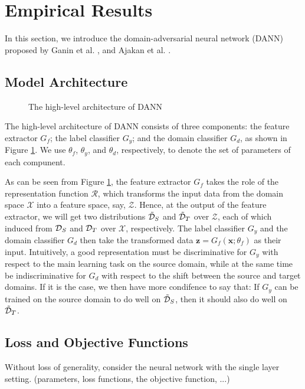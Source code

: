 \section{Empirical Results}\label{sect:dann}
In this section, we introduce the domain-adversarial neural network (DANN) proposed by Ganin et al. \cite{Ganin2016}, \cite{Ganin2015} and Ajakan et al. \cite{Ajakan2014}.

\subsection{Model Architecture}\label{sub:model_arch}
\begin{figure}
  \centering
  
  \caption{The high-level architecture of DANN}
  \label{fig:dann_arch}
\end{figure}

The high-level architecture of DANN consists of three components: the feature extractor $G_f$; the label classifier $G_y$; and the domain classifier $G_d$, as shown in Figure \ref{fig:dann_arch}. We use $\theta_f$, $\theta_y$, and $\theta_d$, respectively, to denote the set of parameters of each compunent.

As can be seen from Figure \ref{fig:dann_arch}, the feature extractor $G_f$ takes the role of the representation function $\mathcal{R}$, which transforms the input data from the domain space $\mathcal{X}$ into a feature space, say, $\mathcal{Z}$. Hence, at the output of the feature extractor, we will get two distributions $\tilde{\mathcal{D}}_S$ and $\tilde{\mathcal{D}}_T$ over $\mathcal{Z}$, each of which induced from $\mathcal{D}_S$ and $\mathcal{D}_T$ over $\mathcal{X}$, respectively. The label classifier $G_y$ and the domain classifier $G_d$ then take the transformed data $\mathbf{z}=G_f(\mathbf{x};\theta_f)$ as their input. Intuitively, a good representation must be discriminative for $G_y$ with respect to the main learning task on the source domain, while at the same time be indiscriminative for $G_d$ with respect to the shift between the source and target domains. If it is the case, we then have more condifence to say that: If $G_y$ can be trained on the source domain to do well on $\tilde{\mathcal{D}}_S$, then it should also do well on $\tilde{\mathcal{D}}_T$.

\subsection{Loss and Objective Functions}
Without loss of generality, consider the neural network with the single layer setting. (parameters, loss functions, the objective function, ...)

